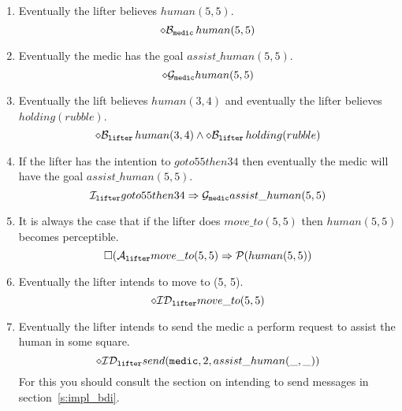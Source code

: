\begin{enumerate}
\item Eventually the lifter believes $human(5, 5)$\index{$\lbeliefop$}.
$$\diamond \mathrm{{\cal B}}_{\texttt{medic}} \, human(5, 5)$$
\item Eventually the medic has the goal $assist\_human(5, 5)$\index{$\lgoalop$}.
$$\diamond \mathrm{{\cal G}}_{\texttt{medic}} human(5, 5)$$
\item Eventually the lift believes $human(3, 4)$ and eventually the lifter believes $holding(rubble)$.
$$\diamond \mathrm{{\cal B}}_{\texttt{lifter}} \, human(3, 4) \wedge \diamond \mathrm{{\cal B}}_{\texttt{lifter}} \, holding(rubble)$$
\item If the lifter has the intention to $goto55then34$ then eventually the medic will have the goal $assist\_human(5, 5)$\index{$\lintentionfunc$}. 
$$\mathrm{{\cal I}}_{\texttt{lifter}} goto55then34 \Rightarrow \mathrm{{\cal G}}_{\texttt{medic}} assist\_human(5, 5)$$
\item It is always the case that if the lifter does $move\_to(5, 5)$ then $human(5, 5)$ becomes perceptible\index{$\lactionsfunc$}\index{$\lperceptfunc$}.  
$$\Box (\mathrm{{\cal A}}_{\texttt{lifter}} move\_to(5, 5) \Rightarrow \mathrm{{\cal P}}(human(5, 5))$$
\item Eventually the lifter intends to move to (5, 5)\index{$\lintendtodofunc$}.
$$\diamond \mathrm{{\cal ID}}_{\texttt{lifter}} move\_to(5, 5)$$
\item Eventually the lifter intends to send the medic a perform request to assist the human in some square.
$$\diamond \mathrm{{\cal ID}}_{\texttt{lifter}} send(\texttt{medic}, 2, assist\_human(\_, \_))$$
For this you should consult the section on intending to send messages in section~\ref{s:impl_bdi}.
\end{enumerate}


